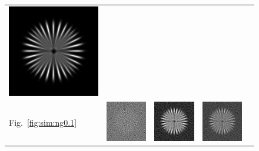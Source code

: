 \documentclass{./packages/optica-article}
\begin{document}
\begin{figure}[hbp]
\begin{tabular}[t]{l c c c c}
		\includegraphics[scale=0.25]{Simulation deconvolution/ref_conv/RL_50.png}
		\\
		Fig.~\ref{fig:sim:ng0.1}                                                        &
		\includegraphics[scale=0.25]{Simulation deconvolution/ref_ng_0.1/RIF_0.01.png}  &
		\includegraphics[scale=0.25]{Simulation deconvolution/ref_ng_0.1/RIF_1.png}     &
		\includegraphics[scale=0.25]{Simulation deconvolution/ref_ng_0.1/RL_10.png}     &

\end{tabular}
\end{figure}
\end{document}

